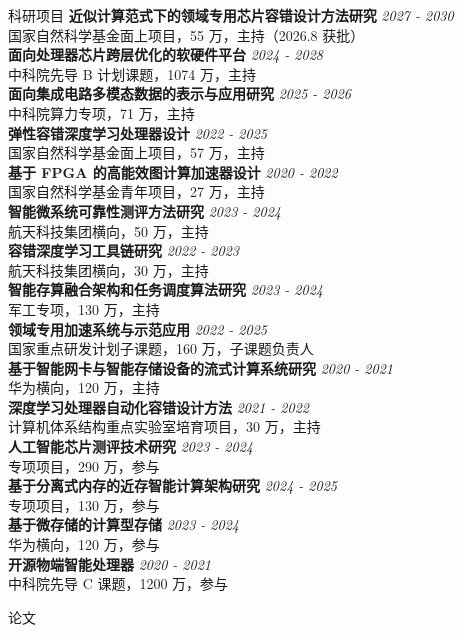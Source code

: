 \documentclass{resume}
\begin{document}
\begin{rSection}{科研项目}
{\bf 近似计算范式下的领域专用芯片容错设计方法研究} \hfill {\em 2027 - 2030} \\
国家自然科学基金面上项目，55 万，主持（2026.8 获批）\\[0.3em]
{\bf 面向处理器芯片跨层优化的软硬件平台} \hfill {\em 2024 - 2028} \\
中科院先导 B 计划课题，1074 万，主持\\[0.3em]
{\bf 面向集成电路多模态数据的表示与应用研究} \hfill {\em 2025 - 2026} \\
中科院算力专项，71 万，主持\\[0.3em]
{\bf 弹性容错深度学习处理器设计} \hfill {\em 2022 - 2025} \\
国家自然科学基金面上项目，57 万，主持\\[0.3em]
{\bf 基于 FPGA 的高能效图计算加速器设计} \hfill {\em 2020 - 2022} \\
国家自然科学基金青年项目，27 万，主持\\[0.3em]
{\bf 智能微系统可靠性测评方法研究} \hfill {\em 2023 - 2024} \\
航天科技集团横向，50 万，主持\\[0.3em]
{\bf 容错深度学习工具链研究} \hfill {\em 2022 - 2023} \\
航天科技集团横向，30 万，主持\\[0.3em]
{\bf 智能存算融合架构和任务调度算法研究} \hfill {\em 2023 - 2024} \\
军工专项，130 万，主持\\[0.3em]
{\bf 领域专用加速系统与示范应用} \hfill {\em 2022 - 2025} \\
国家重点研发计划子课题，160 万，子课题负责人\\[0.3em]
{\bf 基于智能网卡与智能存储设备的流式计算系统研究} \hfill {\em 2020 - 2021} \\
华为横向，120 万，主持\\[0.3em]
{\bf 深度学习处理器自动化容错设计方法} \hfill {\em 2021 - 2022} \\
计算机体系结构重点实验室培育项目，30 万，主持\\[0.3em]
{\bf 人工智能芯片测评技术研究} \hfill {\em 2023 - 2024} \\
专项项目，290 万，参与\\[0.3em]
{\bf 基于分离式内存的近存智能计算架构研究} \hfill {\em 2024 - 2025} \\
专项项目，130 万，参与\\[0.3em]
{\bf 基于微存储的计算型存储} \hfill {\em 2023 - 2024} \\
华为横向，120 万，参与\\[0.3em]
{\bf 开源物端智能处理器} \hfill {\em 2020 - 2021} \\
中科院先导 C 课题，1200 万，参与
\end{rSection}

\begin{rSection}{论文}
\end{rSection}
\nocite{*}
\printbibliography[heading=none]
\end{document}

